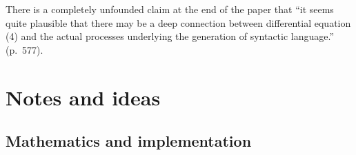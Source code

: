 \documentclass[a4paper]{article}
\begin{document}
There is a completely unfounded claim at the end of the paper that ``it seems quite plausible that there may be a deep connection between differential equation (4) and the actual processes underlying the generation of syntactic language.'' (p.~577).



\section{Notes and ideas}
\label{sec:notes}

\subsection{Mathematics and implementation}
\label{sec:notes:math}
\end{document}
